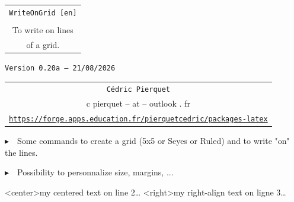 \documentclass[a4paper]{article}
\def\TPversion{0.20a}
\def\TPdate{21/08/2026}
\begin{document}
\pagestyle{fancy}

\thispagestyle{empty}

\vspace{2cm}

\begin{center}
	\begin{minipage}{0.75\linewidth}
	\begin{tcolorbox}[colframe=yellow,colback=yellow!15]
		\begin{center}
			\begin{tabular}{c}
				{\Huge \texttt{WriteOnGrid [en]}}\\
				\\
				{\LARGE To write on lines} \\
				{\LARGE of a grid.}
			\end{tabular}

			\medskip

			{\small \texttt{Version \TPversion{} -- \TPdate}}
		\end{center}
	\end{tcolorbox}
\end{minipage}
\end{center}

\vspace{0.5cm}

\begin{center}
	\begin{tabular}{c}
	\texttt{Cédric Pierquet}\\
	{\ttfamily c pierquet -- at -- outlook . fr}\\
	\texttt{\url{https://forge.apps.education.fr/pierquetcedric/packages-latex}}
\end{tabular}
\end{center}

\vspace{0.5cm}

{$\blacktriangleright$~~Some commands to create a grid (5x5 or Seyes or Ruled) and to write "on" the lines.}

\smallskip

{$\blacktriangleright$~~Possibility to personnalize size, margins, ...}

\vspace{1cm}

\begin{center}
	\begin{EnvGrid}[NumSquares=22x8]
	\WriteLine<center>{my centered text on line 2\ldots}
	\WriteLine<right>{my right-align text on ligne 3\ldots}
	\PassLine
\end{EnvGrid}
\end{center}
\end{document}
